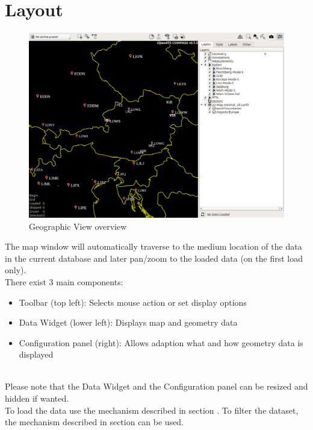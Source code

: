 \section{Layout}

\begin{figure}[H]
    \hspace*{-2.5cm}
    \includegraphics[width=19cm,frame]{figures/geoview_overview.png}
  \caption{Geographic View overview}
  \label{fig:geoview_overview}
\end{figure}

The map window will automatically traverse to the medium location of the data in the current database and later pan/zoom to the loaded data (on the first load only). \\

There exist 3 main components:
\begin{itemize}
 \item Toolbar (top left): Selects mouse action or set display options
 \item Data Widget (lower left): Displays map and geometry data
 \item Configuration panel (right): Allows adaption what and how geometry data is displayed
\end{itemize}
\ \\

Please note that the Data Widget and the Configuration panel can be resized and hidden if wanted. \\

To load the data use the mechanism described in section . To filter the dataset, the mechanism described in section  can be used. \\

